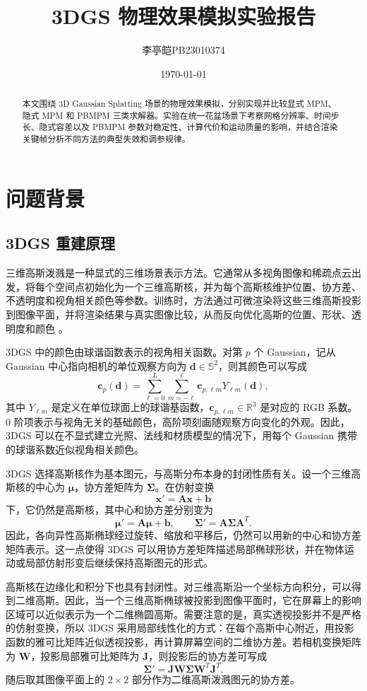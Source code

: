\documentclass[a4paper]{article}
\title{\textbf{3DGS 物理效果模拟实验报告}}
\author{李亭皑\quad PB23010374}
\date{\today}
\begin{document}
\maketitle

\begin{abstract}
本文围绕 3D Gaussian Splatting 场景的物理效果模拟，分别实现并比较显式 MPM、隐式 MPM 和 PBMPM 三类求解器。实验在统一花盆场景下考察网格分辨率、时间步长、隐式容差以及 PBMPM 参数对稳定性、计算代价和运动质量的影响，并结合渲染关键帧分析不同方法的典型失效和调参规律。
\end{abstract}

\section{问题背景}

\subsection{3DGS 重建原理}

三维高斯泼溅是一种显式的三维场景表示方法。它通常从多视角图像和稀疏点云出发，将每个空间点初始化为一个三维高斯核，并为每个高斯核维护位置、协方差、不透明度和视角相关颜色等参数。训练时，方法通过可微渲染将这些三维高斯投影到图像平面，并将渲染结果与真实图像比较，从而反向优化高斯的位置、形状、透明度和颜色 \cite{kerbl2023gaussian}。

3DGS 中的颜色由球谐函数表示的视角相关函数。对第 $p$ 个 Gaussian，记从 Gaussian 中心指向相机的单位观察方向为 $\bm{d}\in\mathbb{S}^2$，则其颜色可以写成
\[
    \bm{c}_p(\bm{d})
    =
    \sum_{\ell=0}^{L}
    \sum_{m=-\ell}^{\ell}
    \bm{c}_{p,\ell m}
    Y_{\ell m}(\bm{d}),
\]
其中 $Y_{\ell m}$ 是定义在单位球面上的球谐基函数，$\bm{c}_{p,\ell m}\in\mathbb{R}^3$ 是对应的 RGB 系数。$0$ 阶项表示与视角无关的基础颜色，高阶项刻画随观察方向变化的外观。因此，3DGS 可以在不显式建立光照、法线和材质模型的情况下，用每个 Gaussian 携带的球谐系数近似视角相关颜色。

3DGS 选择高斯核作为基本图元，与高斯分布本身的封闭性质有关。设一个三维高斯核的中心为 $\bm{\mu}$，协方差矩阵为 $\bm{\Sigma}$。在仿射变换
\[
    \bm{x}'=\bm{A}\bm{x}+\bm{b}
\]
下，它仍然是高斯核，其中心和协方差分别变为
\[
    \bm{\mu}'=\bm{A}\bm{\mu}+\bm{b}, \qquad
    \bm{\Sigma}'=\bm{A}\bm{\Sigma}\bm{A}^{T}.
\]
因此，各向异性高斯椭球经过旋转、缩放和平移后，仍然可以用新的中心和协方差矩阵表示。这一点使得 3DGS 可以用协方差矩阵描述局部椭球形状，并在物体运动或局部仿射形变后继续保持高斯图元的形式。

高斯核在边缘化和积分下也具有封闭性。对三维高斯沿一个坐标方向积分，可以得到二维高斯。因此，当一个三维高斯椭球被投影到图像平面时，它在屏幕上的影响区域可以近似表示为一个二维椭圆高斯。需要注意的是，真实透视投影并不是严格的仿射变换，所以 3DGS 采用局部线性化的方式：在每个高斯中心附近，用投影函数的雅可比矩阵近似透视投影，再计算屏幕空间的二维协方差。若相机变换矩阵为 $\bm{W}$，投影局部雅可比矩阵为 $\bm{J}$，则投影后的协方差可写成
\[
    \bm{\Sigma}'=\bm{J}\bm{W}\bm{\Sigma}\bm{W}^{T}\bm{J}^{T}.
\]
随后取其图像平面上的 $2\times 2$ 部分作为二维高斯泼溅图元的协方差。
\end{document}

